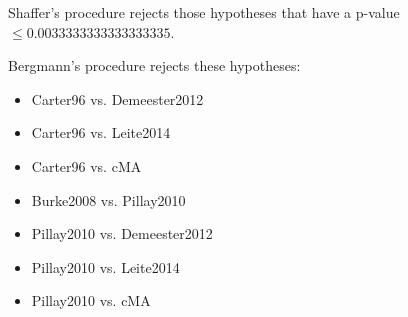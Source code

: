 \documentclass[a4paper,10pt]{article}
\begin{document}
\begin{landscape}
Shaffer's procedure rejects those hypotheses that have a p-value $\le0.0033333333333333335$.


Bergmann's procedure rejects these hypotheses:


\begin{itemize}


\item Carter96 vs. Demeester2012
\item Carter96 vs. Leite2014
\item Carter96 vs. cMA
\item Burke2008 vs. Pillay2010
\item Pillay2010 vs. Demeester2012
\item Pillay2010 vs. Leite2014
\item Pillay2010 vs. cMA
\end{itemize}



\end{landscape}
\end{document}
